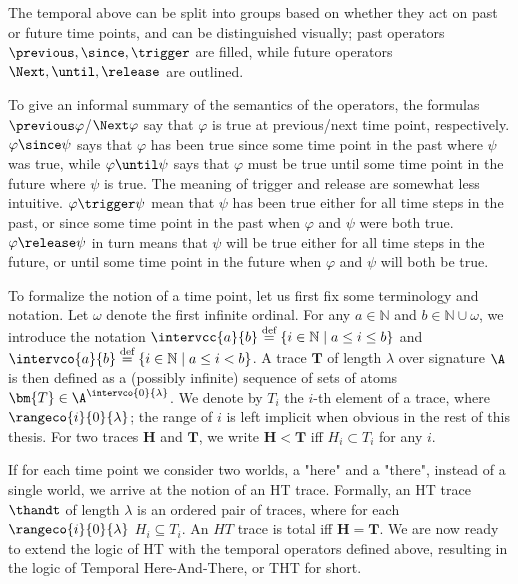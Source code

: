The temporal above can be split into groups based on whether they act
on past or future time points, and can be distinguished visually; past
operators $\previous, \since, \trigger$ are filled, while future
operators $\Next, \until, \release$ are outlined.

To give an informal summary of the semantics of the operators, the
formulas $\previous \varphi$/$\Next \varphi$ say that $\varphi$ is
true at previous/next time point, respectively.  $\varphi \since \psi$
says that $\varphi$ has been true since some time point in the past
where $\psi$ was true, while $\varphi \until \psi$ says that $\varphi$
must be true until some time point in the future where $\psi$ is true.
The meaning of trigger and release are somewhat less
intuitive. $\varphi \trigger \psi$ mean that $\psi$ has been true
either for all time steps in the past, or since some time point in the
past when $\varphi$ and $\psi$ were both true. $\varphi \release \psi$
in turn means that $\psi$ will be true either for all time steps in
the future, or until some time point in the future when $\varphi$ and
$\psi$ will both be true.

To formalize the notion of a time point, let us first fix some
terminology and notation. Let $\omega$ denote the first infinite
ordinal. For any $a \in \mathbb{N}$ and
$b \in \mathbb{N} \cup {\omega}$, we introduce the notation
$\intervcc{a}{b} \defeq \{ i \in \mathbb{N} \mid a \leq i \leq b \}$
and $\intervco{a}{b} \defeq \{ i \in \mathbb{N} \mid a \leq i < b
\}$. A trace $\bm{T}$ of length $\lambda$ over signature $\A$ is then
defined as a (possibly infinite) sequence of sets of atoms
$\bm{T} \in \A^{\intervco{0}{\lambda}}$. We denote by $T_i$ the $i$-th
element of a trace, where $\rangeco{i}{0}{\lambda}$; the range of $i$
is left implicit when obvious in the rest of this thesis. For two
traces $\bm{H}$ and $\bm{T}$, we write $\bm{H < T}$ iff
$H_i \subset T_i$ for any $i$.

If for each time point we consider two worlds, a "here" and a "there",
instead of a single world, we arrive at the notion of an HT
trace. Formally, an HT trace $\thandt$ of length $\lambda$ is an
ordered pair of traces, where for each $\rangeco{i}{0}{\lambda}$
$H_i \subseteq T_i$. An $HT$ trace is total iff $\bm{H} = \bm{T}$. We
are now ready to extend the logic of HT with the temporal operators
defined above, resulting in the logic of Temporal Here-And-There, or
THT for short.

